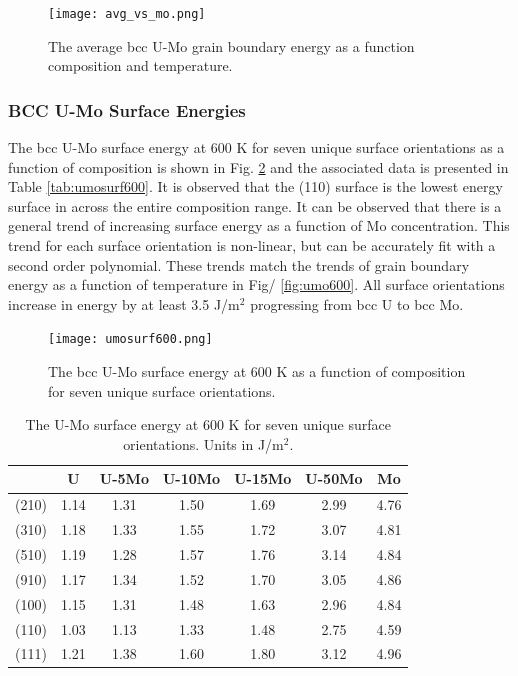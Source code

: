 \documentclass[review]{elsarticle}
\begin{document}
\begin{figure}[h]
 \centering
 \texttt{[image: avg\_vs\_mo.png]} 
 \caption{The average bcc U-Mo grain boundary energy as a function composition and temperature.}
 \label{fig:avgvsmo}
\end{figure}

\FloatBarrier

 
\subsubsection{BCC U-Mo Surface Energies}

The bcc U-Mo surface energy at 600 K for seven unique surface orientations as a function of composition is shown in Fig. \ref{fig:umosurf600} and the associated data is presented in Table \ref{tab:umosurf600}. It is observed that the (110) surface is the lowest energy surface in across the entire composition range. It can be observed that there is a general trend of increasing surface energy as a function of Mo concentration. This trend for each surface orientation is non-linear, but can be accurately fit with a second order polynomial. These trends match the trends of grain boundary energy as a function of temperature in Fig/ \ref{fig:umo600}. All surface orientations increase in energy by at least 3.5 J/m$^{2}$ progressing from bcc U to bcc Mo. 

\begin{figure}[h]
 \centering
 \texttt{[image: umosurf600.png]} 
 \caption{The bcc U-Mo surface energy at 600 K as a function of composition for seven unique surface orientations.}
 \label{fig:umosurf600}
\end{figure}

\begin{table}[h]
\caption{The U-Mo surface energy at 600 K for seven unique surface orientations. Units in J/m$^{2}$. } \label{tab:umosurf600}
\begin{center}
\begin{tabular}{|c|c|c|c|c|c|c|}
	\hline
 & U & U-5Mo & U-10Mo & U-15Mo & U-50Mo & Mo \\
\hline
(210) & 1.14 & 1.31 & 1.50 & 1.69 & 2.99 & 4.76 \\
(310)	 & 1.18 & 1.33 & 1.55 & 1.72 & 3.07 & 4.81 \\ 
(510)	 & 1.19 & 1.28 & 1.57 & 1.76 & 3.14 & 4.84 \\
(910)	 & 1.17 & 1.34 & 1.52 & 1.70 & 3.05 & 4.86 \\
(100)	 & 1.15 & 1.31 & 1.48 & 1.63 & 2.96 & 4.84 \\
(110)	 & 1.03 & 1.13 & 1.33 & 1.48 & 2.75 & 4.59 \\
(111)	 & 1.21 & 1.38 & 1.60 & 1.80 & 3.12 & 4.96 \\
 	 \hline
\end{tabular}
\end{center}
\label{default}
\end{table}
\end{document}

